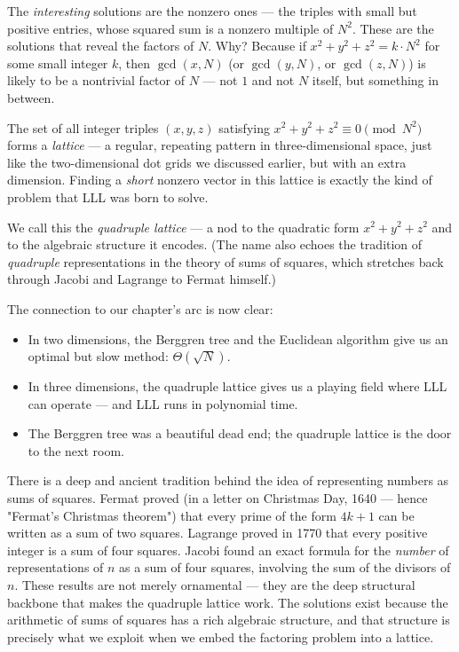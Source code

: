 \documentclass[11pt,twoside,openright]{book}
\theoremstyle{definition}
\theoremstyle{remark}
\begin{document}
The \textit{interesting} solutions are the nonzero ones --- the triples with small but positive entries, whose squared sum is a nonzero multiple of $N^2$. These are the solutions that reveal the factors of $N$. Why? Because if $x^2 + y^2 + z^2 = k \cdot N^2$ for some small integer $k$, then $\gcd(x, N)$ (or $\gcd(y, N)$, or $\gcd(z, N)$) is likely to be a nontrivial factor of $N$ --- not $1$ and not $N$ itself, but something in between.

The set of all integer triples $(x, y, z)$ satisfying $x^2 + y^2 + z^2 \equiv 0 \pmod{N^2}$ forms a \textit{lattice} --- a regular, repeating pattern in three-dimensional space, just like the two-dimensional dot grids we discussed earlier, but with an extra dimension. Finding a \textit{short} nonzero vector in this lattice is exactly the kind of problem that LLL was born to solve.


We call this the \textit{quadruple lattice} --- a nod to the quadratic form $x^2 + y^2 + z^2$ and to the algebraic structure it encodes. (The name also echoes the tradition of \textit{quadruple} representations in the theory of sums of squares, which stretches back through Jacobi and Lagrange to Fermat himself.)

The connection to our chapter's arc is now clear:

\begin{itemize}
  \item In two dimensions, the Berggren tree and the Euclidean algorithm give us an optimal but slow method: $\Theta(\sqrt{N})$.
  \item In three dimensions, the quadruple lattice gives us a playing field where LLL can operate --- and LLL runs in polynomial time.
  \item The Berggren tree was a beautiful dead end; the quadruple lattice is the door to the next room.
\end{itemize}

There is a deep and ancient tradition behind the idea of representing numbers as sums of squares. Fermat proved (in a letter on Christmas Day, 1640 --- hence "Fermat's Christmas theorem") that every prime of the form $4k + 1$ can be written as a sum of two squares. Lagrange proved in 1770 that every positive integer is a sum of four squares. Jacobi found an exact formula for the \textit{number} of representations of $n$ as a sum of four squares, involving the sum of the divisors of $n$. These results are not merely ornamental --- they are the deep structural backbone that makes the quadruple lattice work. The solutions exist because the arithmetic of sums of squares has a rich algebraic structure, and that structure is precisely what we exploit when we embed the factoring problem into a lattice.
\end{document}
